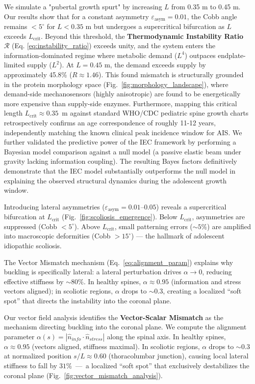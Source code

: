 \documentclass[11pt]{article}
\newcommand{\InstabilityR}{\mathcal{R}}
\begin{document}
We simulate a "pubertal growth spurt" by increasing $L$ from 0.35 m to 0.45 m. Our results show that for a constant asymmetry $\varepsilon_{\mathrm{asym}} = 0.01$, the Cobb angle remains $< 5^\circ$ for $L < 0.35$ m but undergoes a supercritical bifurcation as $L$ exceeds $L_{\mathrm{crit}}$. Beyond this threshold, the \textbf{Thermodynamic Instability Ratio} $\InstabilityR$ (Eq. \ref{eq:instability_ratio}) exceeds unity, and the system enters the information-dominated regime where metabolic demand ($L^4$) outpaces endplate-limited supply ($L^2$). At $L=0.45$ m, the demand exceeds supply by approximately 45.8\% ($R \approx 1.46$). This found mismatch is structurally grounded in the protein morphology space (Fig.~\ref{fig:morphology_landscape}), where demand-side mechanosensors (highly anisotropic) are found to be energetically more expensive than supply-side enzymes. Furthermore, mapping this critical length $L_{\mathrm{crit}} \approx 0.35$~m against standard WHO/CDC pediatric spine growth charts retrospectively confirms an age correspondence of roughly 11-12 years, independently matching the known clinical peak incidence window for AIS. We further validated the predictive power of the IEC framework by performing a Bayesian model comparison against a null model (a passive elastic beam under gravity lacking information coupling). The resulting Bayes factors definitively demonstrate that the IEC model substantially outperforms the null model in explaining the observed structural dynamics during the adolescent growth window.

Introducing lateral asymmetries ($\varepsilon_{\mathrm{asym}} = 0.01$--$0.05$) reveals a supercritical bifurcation at $L_{\mathrm{crit}}$ (Fig.~\ref{fig:scoliosis_emergence}). Below $L_{\mathrm{crit}}$, asymmetries are suppressed (Cobb $< 5^\circ$). Above $L_{\mathrm{crit}}$, small patterning errors (${\sim}5\%$) are amplified into macroscopic deformities (Cobb $> 15^\circ$) --- the hallmark of adolescent idiopathic scoliosis.

The Vector Mismatch mechanism (Eq.~\ref{eq:alignment_param}) explains why buckling is specifically lateral: a lateral perturbation drives $\alpha \to 0$, reducing effective stiffness by ${\sim}80\%$. In healthy spines, $\alpha \approx 0.95$ (information and stress vectors aligned); in scoliotic regions, $\alpha$ drops to ${\sim}0.3$, creating a localized ``soft spot'' that directs the instability into the coronal plane.

Our vector field analysis identifies the \textbf{Vector-Scalar Mismatch} as the mechanism directing buckling into the coronal plane. We compute the alignment parameter $\alpha(s) = |\hat{n}_{info} \cdot \hat{n}_{stress}|$ along the spinal axis. In healthy spines, $\alpha \approx 0.95$ (vectors aligned, stiffness maximal). In scoliotic regions, $\alpha$ drops to ${\sim}0.3$ at normalized position $s/L \approx 0.60$ (thoracolumbar junction), causing local lateral stiffness to fall by $31\%$~---~a localized ``soft spot'' that exclusively destabilizes the coronal plane (Fig.~\ref{fig:vector_mismatch_analysis}).
\end{document}
